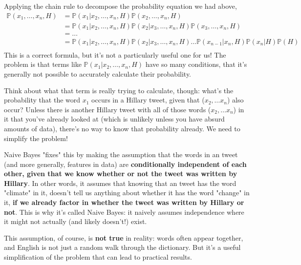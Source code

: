 \documentclass[12pt]{article} \usepackage{amsmath,amssymb,amsthm}
\begin{document}
Applying the chain rule to decompose the probability equation we had above,
\begin{equation}
\begin{split}
  \mathbb{P}(x_1, \dots, x_n, H) & = \mathbb{P}(x_1 | x_2, \dots, x_n, H) \mathbb{P}(x_2, \dots, x_n, H) \\
                                 & = \mathbb{P}(x_1 | x_2, \dots, x_n, H) \mathbb{P}(x_2 | x_3, \dots, x_n, H) \mathbb{P}(x_3, \dots, x_n, H) \\
                                 & = \dots \\
                                 & = \mathbb{P}(x_1 | x_2, \dots, x_n, H) \mathbb{P}(x_2 | x_3, \dots, x_n, H) \dots   \mathbb{P}(x_{n-1} | x_n, H) \mathbb{P}(x_n | H) \mathbb{P}(H) \\
\end{split}
\end{equation}
This is a correct formula, but it's not a particularly useful one for us! The
problem is that terms like $\mathbb{P}(x_1 | x_2, \dots, x_n, H)$ have so many
conditions, that it's generally not possible to accurately calculate their
probability. \newline

Think about what that term is really trying to calculate, though: what's the
probability that the word $x_1$ occurs in a Hillary tweet, given that
($x_2, \dots x_n$) also occur? Unless there is another Hillary tweet with all of
those words ($x_2, \dots x_n$) in it that you've already looked at (which is
unlikely unless you have absurd amounts of data), there's no way to know that
probability already. We need to simplify the problem! \newline

Naive Bayes "fixes" this by making the assumption that the words in an tweet
(and more generally, features in data) are \textbf{conditionally independent of
  each other, given that we know whether or not the tweet was written by
  Hillary}. In other words, it assumes that knowing that an tweet has the word
"climate" in it, doesn't tell us anything about whether it has the word "change"
in it, \textbf{if we already factor in whether the tweet was written by Hillary
  or not}. This is why it's called Naive Bayes: it naively assumes independence
where it might not actually (and likely doesn't!) exist. \newline

This assumption, of course, is \textbf{not true} in reality: words often appear
together, and English is not just a random walk through the dictionary. But it's
a useful simplification of the problem that can lead to practical results.
\newline
\end{document}
